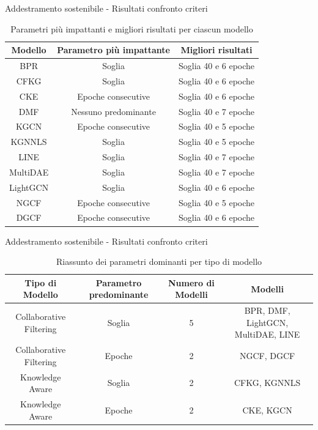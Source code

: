 \begin{frame}{Addestramento sostenibile - Risultati confronto criteri}
\begin{table}[H]
    \scriptsize
    \centering
    \begin{tabular}{|c|c|c|}
        \hline
        \textbf{Modello} & \textbf{Parametro più impattante} & \textbf{Migliori risultati} \\
        \hline
        BPR & Soglia & Soglia 40 e 6 epoche \\
        \hline
        CFKG & Soglia & Soglia 40 e 6 epoche \\
        \hline
        CKE & Epoche consecutive & Soglia 40 e 6 epoche \\
        \hline
        DMF & Nessuno predominante & Soglia 40 e 7 epoche \\
        \hline
        KGCN & Epoche consecutive & Soglia 40 e 5 epoche \\
        \hline
        KGNNLS & Soglia & Soglia 40 e 5 epoche \\
        \hline
        LINE & Soglia & Soglia 40 e 7 epoche \\
        \hline
        MultiDAE & Soglia & Soglia 40 e 7 epoche \\
        \hline
        LightGCN & Soglia & Soglia 40 e 6 epoche \\
        \hline
        NGCF & Epoche consecutive & Soglia 40 e 5 epoche \\
        \hline
        DGCF & Epoche consecutive & Soglia 40 e 6 epoche \\
        \hline
    \end{tabular}
    \caption{Parametri più impattanti e migliori risultati per ciascun modello}
\end{table}
\end{frame}


\begin{frame}{Addestramento sostenibile - Risultati confronto criteri}
\begin{table}[H]
    \scriptsize
    \centering
        \begin{tabular}{|c|c|c|c|}
            \hline
            \textbf{Tipo di Modello} & \textbf{Parametro predominante} & \textbf{Numero di Modelli} & \textbf{Modelli} \\ \hline
            Collaborative Filtering & Soglia & 5 & BPR, DMF, LightGCN, MultiDAE, LINE \\ \hline
            Collaborative Filtering & Epoche & 2 & NGCF, DGCF \\ \hline
            Knowledge Aware & Soglia & 2 & CFKG, KGNNLS \\ \hline
            Knowledge Aware & Epoche & 2 & CKE, KGCN \\ \hline
        \end{tabular}
    \caption{Riassunto dei parametri dominanti per tipo di modello}
\end{table}

\end{frame}
